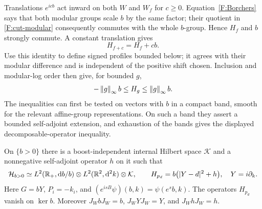 Translations $e^{icb}$ act inward on both $W$ and $W_f$ for $c\ge0$.
Equation~\eqref{F:Borchers} says that both modular groups scale $b$ by
the same factor; their quotient in \eqref{F:cut-modular} consequently
commutes with the whole $b$-group. Hence $H_f$ and $b$ strongly commute.
A constant translation gives
\begin{equation}\label{F:constant-shifts}
 H_{f+c}=H_f+cb.
\end{equation}
Use this identity to define signed profiles bounded below; it agrees
with their modular difference and is independent of the positive shift
chosen. Inclusion and modular-log order then give, for bounded $g$,
\begin{equation}\label{F:bounded-cut-bound}
 -\left\lVert g\right\rVert_\infty b\le H_g\le\left\lVert g\right\rVert_\infty b.
\end{equation}
The inequalities can first be tested on vectors with $b$ in a compact
band, smooth for the relevant affine-group representations. On such a
band they assert a bounded self-adjoint extension, and exhaustion of
the bands gives the displayed decomposable-operator inequality.

\begin{proposition}\label{F:parabolic-generator}
On $\{b>0\}$ there is a boost-independent internal Hilbert space
$\mathcal K$ and a nonnegative self-adjoint operator $h$ on it such that
\begin{equation}\label{F:parabolic-form}
 \mathcal H_{b>0}\simeq
 L^2(\mathbb R_+,\mathrm d b/b)\otimes L^2(\mathbb R^2,\mathrm d^2k)\otimes\mathcal K,
 \qquad H_{p_d}=b\bigl(|Y-d|^2+h\bigr),\quad Y=i\partial_k.
\end{equation}
Here $G=bY$, $P_i=-k_i$, and
$(e^{isB}\psi)(b,k)=\psi(e^sb,k)$.
The operators $H_{p_d}$ vanish on $\ker b$. Moreover
$J_WbJ_W=b$, $J_WYJ_W=Y$, and $J_WhJ_W=h$.
\end{proposition}

